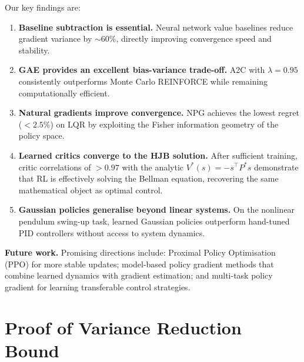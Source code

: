\documentclass[11pt, a4paper]{article}
\newcommand{\T}{\top}
\begin{document}
Our key findings are:
\begin{enumerate}
    \item \textbf{Baseline subtraction is essential.}
    Neural network value baselines reduce gradient variance by $\sim 60\%$,
    directly improving convergence speed and stability.
    
    \item \textbf{GAE provides an excellent bias-variance trade-off.}
    A2C with $\lambda = 0.95$ consistently outperforms Monte Carlo REINFORCE
    while remaining computationally efficient.
    
    \item \textbf{Natural gradients improve convergence.}
    NPG achieves the lowest regret ($< 2.5\%$) on LQR by exploiting the
    Fisher information geometry of the policy space.
    
    \item \textbf{Learned critics converge to the HJB solution.}
    After sufficient training, critic correlations of $> 0.97$ with the analytic
    $V^*(s) = -s^\T P^* s$ demonstrate that RL is effectively solving the
    Bellman equation, recovering the same mathematical object as optimal control.
    
    \item \textbf{Gaussian policies generalise beyond linear systems.}
    On the nonlinear pendulum swing-up task, learned Gaussian policies
    outperform hand-tuned PID controllers without access to system dynamics.
\end{enumerate}

\textbf{Future work.}
Promising directions include:
Proximal Policy Optimisation (PPO) \citep{schulman2017} for more stable updates;
model-based policy gradient methods that combine learned dynamics with gradient
estimation; and multi-task policy gradient for learning transferable control strategies.


\printbibliography


\appendix

\section{Proof of Variance Reduction Bound}
\end{document}
